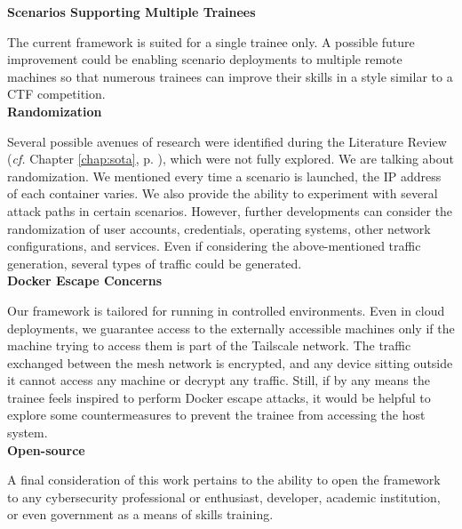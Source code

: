 \textbf{Scenarios Supporting Multiple Trainees}

The current framework is suited for a single trainee only. A possible future improvement could be enabling scenario deployments to multiple remote machines so that numerous trainees can improve their skills in a style similar to a CTF competition.\\

\textbf{Randomization}

Several possible avenues of research were identified during the Literature Review (\textit{cf.} Chapter \ref{chap:sota}, p. \pageref{chap:sota}), which were not fully explored. We are talking about randomization. We mentioned every time a scenario is launched, the IP address of each container varies. We also provide the ability to experiment with several attack paths in certain scenarios. However, further developments can consider the randomization of user accounts, credentials, operating systems, other network configurations, and services. Even if considering the above-mentioned traffic generation, several types of traffic could be generated.\\

\textbf{Docker Escape Concerns}

Our framework is tailored for running in controlled environments. Even in cloud deployments, we guarantee access to the externally accessible machines only if the machine trying to access them is part of the Tailscale network. The traffic exchanged between the mesh network is encrypted, and any device sitting outside it cannot access any machine or decrypt any traffic. Still, if by any means the trainee feels inspired to perform Docker escape attacks, it would be helpful to explore some countermeasures to prevent the trainee from accessing the host system.\\

\textbf{Open-source}

A final consideration of this work pertains to the ability to open the framework to any cybersecurity professional or enthusiast, developer, academic institution, or even government as a means of skills training.
